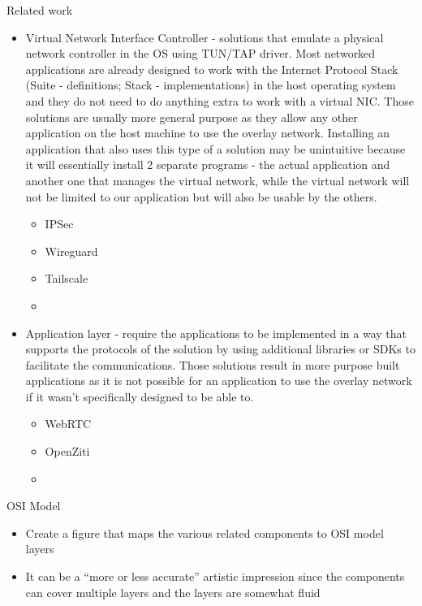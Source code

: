 \begin{frame}[fragile]{Related work}
\begin{itemize}
\begin{itemize}
    \begin{itemize}
    \tightlist
    \item
      Virtual Network Interface Controller - solutions that emulate a
      physical network controller in the OS using TUN/TAP driver. Most
      networked applications are already designed to work with the
      Internet Protocol Stack (Suite - definitions; Stack -
      implementations) in the host operating system and they do not need
      to do anything extra to work with a virtual NIC. Those solutions
      are usually more general purpose as they allow any other
      application on the host machine to use the overlay network.
      Installing an application that also uses this type of a solution
      may be unintuitive because it will essentially install 2 separate
      programs - the actual application and another one that manages the
      virtual network, while the virtual network will not be limited to
      our application but will also be usable by the others.

      \begin{itemize}
      \tightlist
      \item
        IPSec
      \item
        Wireguard
      \item
        Tailscale
      \item
      \end{itemize}
    \item
      Application layer - require the applications to be implemented in
      a way that supports the protocols of the solution by using
      additional libraries or SDKs to facilitate the communications.
      Those solutions result in more purpose built applications as it is
      not possible for an application to use the overlay network if it
      wasn't specifically designed to be able to.

      \begin{itemize}
      \tightlist
      \item
        WebRTC
      \item
        OpenZiti
      \item
      \end{itemize}
    \end{itemize}
  \end{itemize}
\end{itemize}

\begin{block}{OSI Model}
\protect\hypertarget{osi-model}{}
\begin{itemize}
\tightlist
\item
  Create a figure that maps the various related components to OSI model
  layers
\item
  It can be a ``more or less accurate'' artistic impression since the
  components can cover multiple layers and the layers are somewhat fluid
\end{itemize}


\end{block}
\end{frame}
